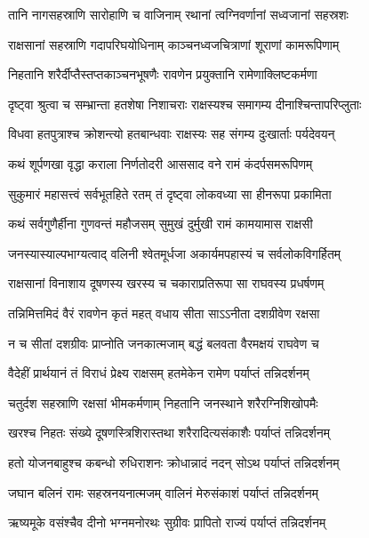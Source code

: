 
\twolineshloka
{तानि नागसहस्राणि सारोहाणि च वाजिनाम्}
{रथानां त्वग्निवर्णानां सध्वजानां सहस्रशः} %

\twolineshloka
{राक्षसानां सहस्राणि गदापरिघयोधिनाम्}
{काञ्चनध्वजचित्राणां शूराणां कामरूपिणाम्} %

\twolineshloka
{निहतानि शरैर्दीप्तैस्तप्तकाञ्चनभूषणैः}
{रावणेन प्रयुक्तानि रामेणाक्लिष्टकर्मणा} %

\twolineshloka
{दृष्ट्वा श्रुत्वा च सम्भ्रान्ता हतशेषा निशाचराः}
{राक्षस्यश्च समागम्य दीनाश्चिन्तापरिप्लुताः} %

\twolineshloka
{विधवा हतपुत्राश्च क्रोशन्त्यो हतबान्धवाः}
{राक्षस्यः सह संगम्य दुःखार्ताः पर्यदेवयन्} %

\twolineshloka
{कथं शूर्पणखा वृद्धा कराला निर्णतोदरी}
{आससाद वने रामं कंदर्पसमरूपिणम्} %

\twolineshloka
{सुकुमारं महासत्त्वं सर्वभूतहिते रतम्}
{तं दृष्ट्वा लोकवध्या सा हीनरूपा प्रकामिता} %

\twolineshloka
{कथं सर्वगुणैर्हीना गुणवन्तं महौजसम्}
{सुमुखं दुर्मुखी रामं कामयामास राक्षसी} %

\twolineshloka
{जनस्यास्याल्पभाग्यत्वाद् वलिनी श्वेतमूर्धजा}
{अकार्यमपहास्यं च सर्वलोकविगर्हितम्} %

\twolineshloka
{राक्षसानां विनाशाय दूषणस्य खरस्य च}
{चकाराप्रतिरूपा सा राघवस्य प्रधर्षणम्} %

\twolineshloka
{तन्निमित्तमिदं वैरं रावणेन कृतं महत्}
{वधाय सीता साऽऽनीता दशग्रीवेण रक्षसा} %

\twolineshloka
{न च सीतां दशग्रीवः प्राप्नोति जनकात्मजाम्}
{बद्धं बलवता वैरमक्षयं राघवेण च} %

\twolineshloka
{वैदेहीं प्रार्थयानं तं विराधं प्रेक्ष्य राक्षसम्}
{हतमेकेन रामेण पर्याप्तं तन्निदर्शनम्} %

\twolineshloka
{चतुर्दश सहस्राणि रक्षसां भीमकर्मणाम्}
{निहतानि जनस्थाने शरैरग्निशिखोपमैः} %

\twolineshloka
{खरश्च निहतः संख्ये दूषणस्त्रिशिरास्तथा}
{शरैरादित्यसंकाशैः पर्याप्तं तन्निदर्शनम्} %

\twolineshloka
{हतो योजनबाहुश्च कबन्धो रुधिराशनः}
{क्रोधान्नादं नदन् सोऽथ पर्याप्तं तन्निदर्शनम्} %

\twolineshloka
{जघान बलिनं रामः सहस्रनयनात्मजम्}
{वालिनं मेरुसंकाशं पर्याप्तं तन्निदर्शनम्} %

\twolineshloka
{ऋष्यमूके वसंश्चैव दीनो भग्नमनोरथः}
{सुग्रीवः प्रापितो राज्यं पर्याप्तं तन्निदर्शनम्} %

